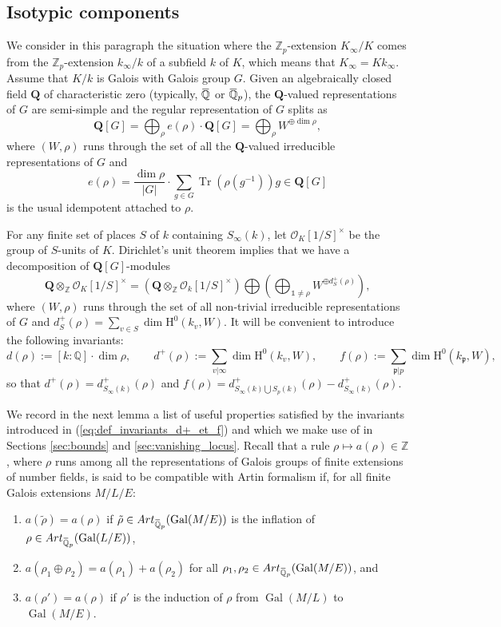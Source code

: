 \documentclass[12pt]{amsart}
\newcommand{\Q}{\mathbb{Q}}
\newcommand{\Z}{\mathbb{Z}}
\newcommand\bZ{\mathbb{Z}}
\newcommand\bQ{\mathbb{Q}}
\newcommand\Zp{{\mathbb{Z}_p}}
\newcommand\cO{\mathcal{O}}
\newcommand\gp{\mathfrak{p}}
\newcommand{\ob}[1]{\mkern 1.5mu\overline{\mkern-1.5mu#1\mkern-1.5mu}\mkern 1.5mu}
\newcommand{\Art}{\textrm{Art}}
\DeclareMathOperator{\Gal}{Gal}
\DeclareMathOperator{\Tr}{Tr}
\newcommand{\HH}{\mathrm{H}}
\theoremstyle{defstyle}
\theoremstyle{thmstyle}
\begin{document}
	\subsection{Isotypic components}\label{sec:isotypic}
	We consider in this paragraph the situation where the $\Zp$-extension $K_\infty/K$ comes from the $\Zp$-extension $k_\infty/k$ of a subfield $k$ of $K$, which means that $K_\infty=Kk_\infty$. Assume that $K/k$ is Galois with Galois group $G$. 
	Given an algebraically closed field $\mathbf{Q}$ of characteristic zero (typically, $\ob{\bQ}$ or $\ob{\bQ}_p$), the $\textbf{Q}$-valued representations of $G$ are semi-simple and the regular representation of $G$ splits as
	$$\textbf{Q}[G] = \bigoplus_{\rho} e(\rho)\cdot \textbf{Q}[G] = \bigoplus_\rho W^{\oplus \dim \rho},$$
	where $(W,\rho)$ runs through the set of all the $\textbf{Q}$-valued irreducible representations of $G$ and 
	\begin{equation}\label{eq:idempotent}
	e(\rho)= \frac{\dim \rho}{|G|} \cdot \sum_{g\in G} \Tr(\rho(g^{-1}))g \in \textbf{Q}[G]
	\end{equation}
	is the usual idempotent attached to $\rho$. 
	
	For any finite set of places $S$ of $k$ containing $S_\infty(k)$, let $\cO_K[1/S]^\times$ be the group of $S$-units of $K$. Dirichlet's unit theorem implies that we have a decomposition of $\textbf{Q}[G]$-modules
	$$\textbf{Q}\otimes_\bZ \cO_K[1/S]^\times = \left(\textbf{Q}\otimes_{\Z} \cO_k[1/S]^\times\right) \bigoplus\left( \bigoplus_{\mathds{1}\neq\rho} W^{\oplus d^+_{S}(\rho)}\right),$$
	where $(W,\rho)$ runs through the set of all non-trivial irreducible representations of $G$ and $d^+_{S}(\rho)= \sum_{v\in S}\dim \HH^0(k_v,W)$. It will be convenient to introduce the following invariants: 
	\begin{equation}\label{eq:def_invariants_d+_et_f}
		d(\rho):=[k:\Q]\cdot \dim \rho, \qquad	d^+(\rho):= \sum_{v|\infty} \dim \HH^0(k_v,W), \qquad f(\rho):=\sum_{\gp|p} \dim \HH^0(k_\gp,W),
	\end{equation}
	so that $d^+(\rho)=d^+_{S_\infty(k)}(\rho)$ and $f(\rho)=d^+_{S_\infty(k)\bigcup S_p(k)}(\rho)-d^+_{S_\infty(k)}(\rho)$. 
	
	We record in the next lemma a list of useful properties satisfied by the invariants introduced in (\ref{eq:def_invariants_d+_et_f}) and which we make use of in Sections \ref{sec:bounds} and \ref{sec:vanishing_locus}. Recall that a rule $\rho \mapsto a(\rho)\in \Z$, where $\rho$ runs among all the representations of Galois groups of finite extensions of number fields, is said to be compatible with Artin formalism if, for all finite Galois extensions $M/L/E$:
	\begin{enumerate}
		\item[(a)] $a(\tilde{\rho})=a({\rho})$ if $\tilde{\rho}\in \Art_{\ob{\bQ}_p}(\Gal(M/E))$ is the inflation of $\rho\in \Art_{\ob{\bQ}_p}(\Gal(L/E))$,
		\item[(b)] $a(\rho_1 \oplus \rho_2)=a(\rho_1)+a(\rho_2)$ for all $\rho_1,\rho_2 \in \Art_{\ob{\bQ}_p}(\Gal(M/E))$, and
		\item[(c)] $a(\rho')=a(\rho)$ if $\rho'$ is the induction of $\rho$ from $\Gal(M/L)$ to $\Gal(M/E)$.
	\end{enumerate}
	
\end{document}
